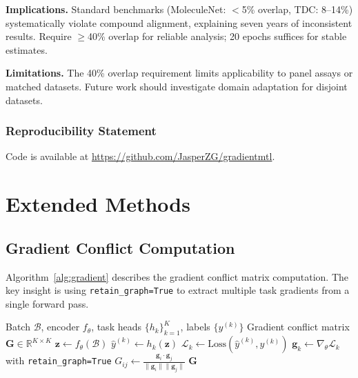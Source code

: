 \documentclass{article}
\newcommand{\G}{\mathbf{G}}
\begin{document}
\textbf{Implications.} Standard benchmarks (MoleculeNet: $<$5\% overlap, TDC: 8--14\%) systematically violate compound alignment, explaining seven years of inconsistent results. Require $\geq$40\% overlap for reliable analysis; 20 epochs suffices for stable estimates.

\textbf{Limitations.} The 40\% overlap requirement limits applicability to panel assays or matched datasets. Future work should investigate domain adaptation for disjoint datasets.

\subsubsection*{Reproducibility Statement}
Code is available at \url{https://github.com/JasperZG/gradientmtl}.




\newpage
\appendix

\section{Extended Methods}

\subsection{Gradient Conflict Computation}

Algorithm~\ref{alg:gradient} describes the gradient conflict matrix computation. The key insight is using \texttt{retain\_graph=True} to extract multiple task gradients from a single forward pass.

\begin{algorithm}[ht]
\caption{Gradient Conflict Matrix Computation}
\label{alg:gradient}
\begin{algorithmic}[1]
\REQUIRE Batch $\mathcal{B}$, encoder $f_\theta$, task heads $\{h_k\}_{k=1}^K$, labels $\{y^{(k)}\}$
\ENSURE Gradient conflict matrix $\G \in \mathbb{R}^{K \times K}$
\STATE $\mathbf{z} \leftarrow f_\theta(\mathcal{B})$ 
    \STATE $\hat{y}^{(k)} \leftarrow h_k(\mathbf{z})$ 
    \STATE $\mathcal{L}_k \leftarrow \text{Loss}(\hat{y}^{(k)}, y^{(k)})$ 
    \STATE $\mathbf{g}_k \leftarrow \nabla_\theta \mathcal{L}_k$ with \texttt{retain\_graph=True}
\ENDFOR
{}
        \STATE $G_{ij} \leftarrow \frac{\mathbf{g}_i \cdot \mathbf{g}_j}{\|\mathbf{g}_i\| \|\mathbf{g}_j\|}$ 
    \ENDFOR
\ENDFOR
\RETURN $\G$
\end{algorithmic}
\end{algorithm}
\end{document}
